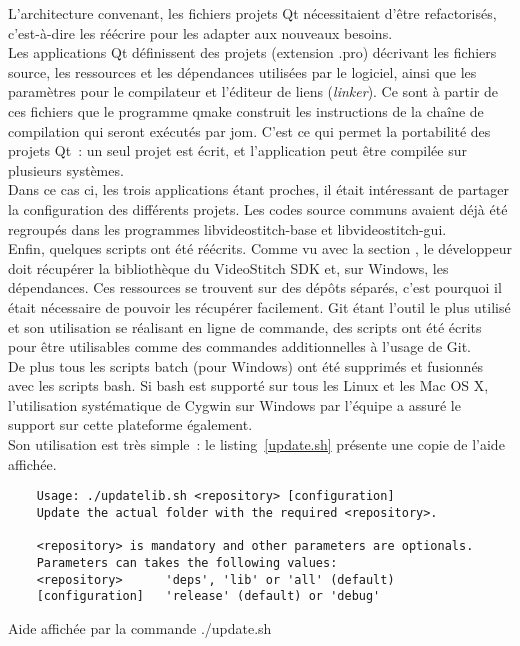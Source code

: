 \newline
L'architecture convenant, les fichiers projets Qt nécessitaient d'être refactorisés,
c'est-à-dire les réécrire pour les adapter aux nouveaux besoins.\\
Les applications Qt définissent des projets (extension .pro) décrivant
les fichiers source, les ressources et les dépendances utilisées par le logiciel, ainsi que les
paramètres pour le compilateur et l'éditeur de liens (\textit{linker}). Ce sont à 
partir de ces fichiers que le programme qmake construit les instructions de la chaîne
de compilation qui seront exécutés par jom\cite{qt}. C'est ce qui permet la portabilité
des projets Qt~: un seul projet est écrit, et l'application peut être compilée sur
plusieurs systèmes.\\
Dans ce cas ci, les trois applications étant proches, il était intéressant de partager
la configuration des différents projets. Les codes source communs avaient déjà été
regroupés dans les programmes libvideostitch-base et libvideostitch-gui.
\ \\
\newline
Enfin, quelques scripts ont été réécrits. Comme vu avec la section , le
développeur doit récupérer la bibliothèque du VideoStitch SDK et, sur Windows,
les dépendances. Ces ressources se trouvent sur des dépôts séparés, c'est pourquoi
il était nécessaire de pouvoir les récupérer facilement. Git étant l'outil le plus
utilisé et son utilisation se réalisant en ligne de commande,
des scripts ont été écrits pour être utilisables comme des commandes additionnelles à l'usage de Git.\\
De plus tous les scripts batch (pour Windows) ont été supprimés et fusionnés avec
les scripts bash. Si bash est supporté sur tous les Linux et les Mac OS X,
l'utilisation systématique de Cygwin sur Windows par l'équipe a assuré le support
sur cette plateforme également.\\
Son utilisation est très simple~: le listing~\ref{update.sh} présente une copie de l'aide affichée.
\begin{listing}
  \begin{verbatim}
    Usage: ./updatelib.sh <repository> [configuration]
    Update the actual folder with the required <repository>.

    <repository> is mandatory and other parameters are optionals.
    Parameters can takes the following values:
    <repository>      'deps', 'lib' or 'all' (default)
    [configuration]   'release' (default) or 'debug'
  \end{verbatim}
  \caption{Aide affichée par la commande ./update.sh}
  \label{update.sh}
\end{listing}
